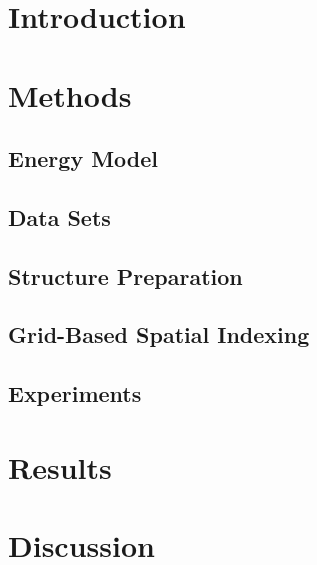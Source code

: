 \maketitle
\doublespacing
\begin{abstract}

\end{abstract}

\section*{Introduction}
\label{sec:intro}


\section*{Methods}
\label{sec:cell/methods}
    \subsection*{Energy Model}
    \label{subsec:energy_model}
    

    \subsection*{Data Sets}
    \label{subsec:data_sets}
    

    \subsection*{Structure Preparation}
    \label{subsec:structure_preparation}
    

    \subsection*{Grid-Based Spatial Indexing}
    \label{subsec:grid_based_indexing}
    

    \subsection*{Experiments}
    \label{subsec:experiments}
    

\section*{Results}
\label{sec:results}


\section*{Discussion}
\label{sec:discussion}







